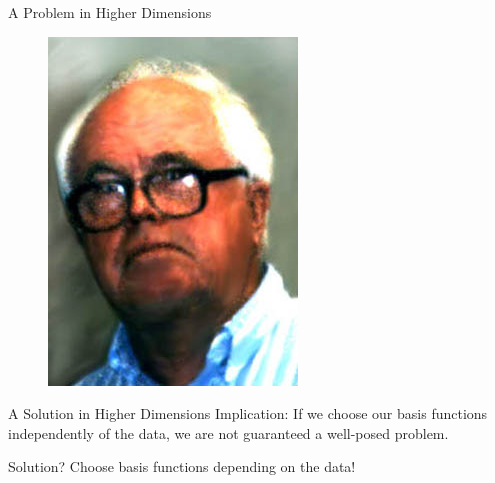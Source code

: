 \documentclass[12pt,t]{beamer}
\newcommand{\subt}[1]{{\footnotesize \color{subtitle} {#1}}}
\begin{document}
\begin{frame}{A Problem in Higher Dimensions}
\begin{figure}[!htb]
  \includegraphics[width=\linewidth]{Curtis.jpg}
\endminipage
\end{figure}


\note{}
\end{frame}

\begin{frame}[c]{A Solution in Higher Dimensions}
\subt{Implication:}
If we choose our basis functions independently of the data, we are not guaranteed a well-posed problem.
\bigskip

\subt{Solution?}
\pause
Choose basis functions depending on the data!
\bigskip

\note{}
\end{frame}
\end{document}
